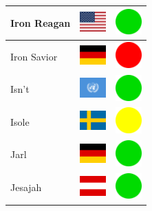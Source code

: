 \documentclass[12pt, a4paper, twoside]{report}
\begin{document}
\begin{center}
\begin{longtable}{|p{5cm}|p{2cm}|p{2cm}|}
 Iron Reagan                                                & \includegraphics[width=1cm]{../4x3/us} &   \includegraphics[width=1cm]{../likes/y} \\ \hline
 Iron Savior                                                & \includegraphics[width=1cm]{../4x3/de} &   \includegraphics[width=1cm]{../likes/n} \\ \hline
 Isn't                                                      & \includegraphics[width=1cm]{../4x3/un} &   \includegraphics[width=1cm]{../likes/y} \\ \hline
 Isole                                                      & \includegraphics[width=1cm]{../4x3/se} &   \includegraphics[width=1cm]{../likes/m} \\ \hline
 Jarl                                                       & \includegraphics[width=1cm]{../4x3/de} &   \includegraphics[width=1cm]{../likes/y} \\ \hline
 Jesajah                                                    & \includegraphics[width=1cm]{../4x3/at} &   \includegraphics[width=1cm]{../likes/y} \\ \hline

\end{longtable}
\end{center}
\end{document}
